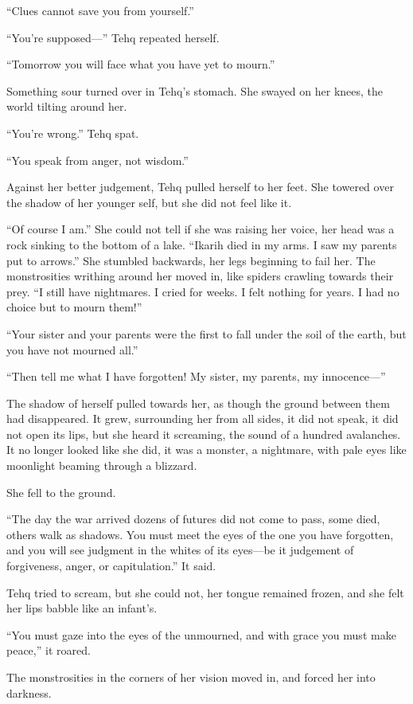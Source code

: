 ``Clues cannot save you from yourself.''

``You're supposed---'' Tehq repeated herself.

``Tomorrow you will face what you have yet to mourn.''

Something sour turned over in Tehq's stomach. She swayed on her knees, the world tilting around her.

``You're wrong.'' Tehq spat.

``You speak from anger, not wisdom.''

Against her better judgement, Tehq pulled herself to her feet. She towered over the shadow of her younger self, but she did not feel like it.

``Of course I am.'' She could not tell if she was raising her voice, her head was a rock sinking to the bottom of a lake. ``Ikarih died in my arms. I saw my parents put to arrows.'' She stumbled backwards, her legs beginning to fail her. The monstrosities writhing around her moved in, like spiders crawling towards their prey. ``I still have nightmares. I cried for weeks. I felt nothing for years. I had no choice but to mourn them!''

``Your sister and your parents were the first to fall under the soil of the earth, but you have not mourned all.''

``Then tell me what I have forgotten! My sister, my parents, my innocence---''

The shadow of herself pulled towards her, as though the ground between them had disappeared. It grew, surrounding her from all sides, it did not speak, it did not open its lips, but she heard it screaming, the sound of a hundred avalanches. It no longer looked like she did, it was a monster, a nightmare, with pale eyes like moonlight beaming through a blizzard.

She fell to the ground.

``The day the war arrived dozens of futures did not come to pass, some died, others walk as shadows. You must meet the eyes of the one you have forgotten, and you will see judgment in the whites of its eyes---be it judgement of forgiveness, anger, or capitulation.'' It said.

Tehq tried to scream, but she could not, her tongue remained frozen, and she felt her lips babble like an infant's.

``You must gaze into the eyes of the unmourned, and with grace you must make peace,'' it roared.

The monstrosities in the corners of her vision moved in, and forced her into darkness.

